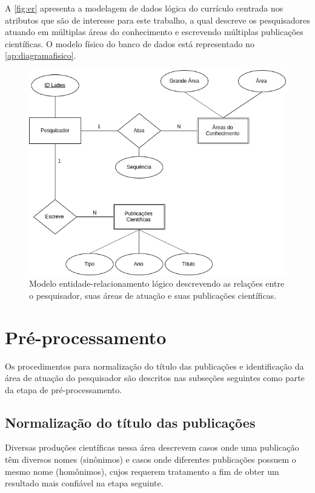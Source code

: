 A \autoref{fig:er} apresenta a modelagem de dados lógica do currículo centrada nos atributos que são de interesse para este trabalho, a qual descreve os pesquisadores atuando em múltiplas áreas do conhecimento e escrevendo múltiplas publicações científicas. O modelo físico do banco de dados está representado no \autoref{ap:diagramafisico}.

\begin{figure}[htpb]
  \centering
  \includegraphics[scale=.5]{figuras/metodo-modelo-logico-lattes}
  \caption{Modelo entidade-relacionamento lógico descrevendo as relações entre o pesquisador, suas áreas de atuação e suas publicações científicas.}
  \label{fig:er}
\end{figure}

\section{Pré-processamento}

Os procedimentos para normalização do título das publicações e identificação da área de atuação do pesquisador são descritos nas subseções seguintes como parte da etapa de pré-processamento.

\subsection{Normalização do título das publicações}

Diversas produções científicas nessa área \cite{franceschet2011collaboration} \cite{mena2013prospecccao} \cite{reuther2006managing} descrevem casos onde uma publicação têm diversos nomes (sinônimos) e casos onde diferentes publicações possuem o mesmo nome (homônimos), cujos requerem tratamento a fim de obter um resultado mais confiável na etapa seguinte.


